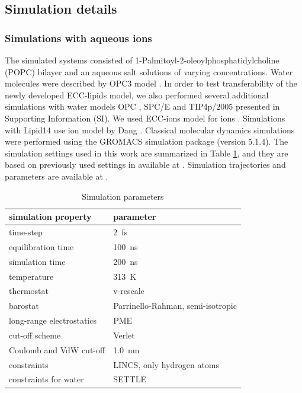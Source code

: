 \documentclass[aip,jcp,twocolumn]{revtex4}
\begin{document}
\subsection{Simulation details}

\subsubsection{Simulations with aqueous ions}
The simulated systems consisted of 1-Palmitoyl-2-oleoylphosphatidylcholine
(POPC) bilayer and an aqueous salt solutions of varying concentrations.
Water molecules were described by OPC3 model \cite{Izadi16}.
In order to test transferability of the newly developed ECC-lipids model, 
we also performed several additional simulations with water models 
OPC \cite{Izadi14}, SPC/E \cite{Berendsen1987} and TIP4p/2005 \cite{Abascal2005}
presented in Supporting Information (SI). 
We used ECC-ions model for ions \cite{jungwirth17-new-paper-to-be-published, kohagen16, Pluharova2014}.  %
Simulations with Lipid14 use ion model by Dang \cite{smith94,chang1999,dang2006}. 
Classical molecular dynamics simulations were performed using the GROMACS \cite{Abraham15} simulation package (version 5.1.4).  
The simulation settings used in this work are 
summarized in Table \ref{tbl:mdpar}, 
and they are based on previously used settings in \cite{catte16} available at \cite{lipid14POPC0mMNaClfiles}. 
Simulation trajectories and parameters are available at \cite{??} .

\begin{table}[btp]
  \caption{Simulation parameters}
  \label{tbl:mdpar}
  \begin{tabular}{ll}
    simulation property & parameter   \\
    \hline
    time-step           & 2~fs         \\
    equilibration time  & 100~ns  \\
    simulation time     & 200~ns  \\
    temperature         & 313~K       \\
    thermostat          & v-rescale  \cite{bussi07}   \\
    barostat            & Parrinello-Rahman, semi-isotropic \cite{parrinello81} \\
    long-range electrostatics & PME  \cite{darden93}  \\
    cut-off scheme      & Verlet \cite{Pall13}      \\
    Coulomb and VdW cut-off & 1.0~nm \\
    constraints         & LINCS, only hydrogen atoms \cite{hess97} \\
    constraints for water & SETTLE  \cite{miyamoto92} \\
    \hline
  \end{tabular}
\end{table}
\end{document}
